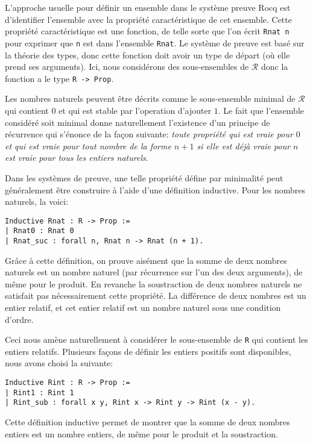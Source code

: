 \documentclass[draft]{jflart}
\begin{document}
L'approche usuelle pour définir un ensemble dans le système preuve
Rocq est d'identifier l'ensemble avec la propriété caractéristique de
cet ensemble.  Cette propriété caractéristique est une fonction, de
telle sorte que l'on écrit \texttt{Rnat n} pour exprimer que \texttt{n} est
dans l'ensemble \texttt{Rnat}.  Le système de preuve est basé sur la
théorie des types, donc cette fonction doit avoir un type de départ
(où elle prend ses arguments).  Ici, nous considérons des
sous-ensembles de \(\mathcal R\) donc la fonction a le type \texttt{R ->
  Prop}.

Les nombres naturels peuvent être décrits comme le sous-ensemble
minimal de \(\mathcal R\) qui contient \(0\) et qui est stable par
l'operation d'ajouter \(1\).  Le fait que l'ensemble considéré soit
minimal donne naturellement l'existence d'un principe de récurrence
qui s'énonce de la façon suivante: {\em toute propriété qui est vraie
  pour \(0\) et qui est vraie pour tout nombre de la forme \(n + 1\)
  si elle est déjà vraie pour \(n\) est vraie pour tous les entiers
  naturels}.

Dans les systèmes de preuve, une telle propriété défine par minimalité
peut généralement être construire à l'aide d'une définition inductive.
Pour les nombres naturels, la voici:
\begin{verbatim}
Inductive Rnat : R -> Prop :=
| Rnat0 : Rnat 0
| Rnat_suc : forall n, Rnat n -> Rnat (n + 1).
\end{verbatim}

Grâce à cette définition, on prouve aisément que la somme de deux
nombres naturels est un nombre naturel (par récurrence sur l'un des
deux arguments), de même pour le produit.  En revanche la soustraction
de deux nombres naturels ne satisfait pas nécessairement cette
propriété.  La différence de deux nombres est un entier relatif, et
cet entier relatif est un nombre naturel sous une condition d'ordre.

Ceci nous amène naturellement à considérer le sous-ensemble de \texttt{R}
qui contient les entiers relatifs.  Plusieurs façons de définir les
entiers positifs sont disponibles, nous avons choisi la suivante:
\begin{verbatim}
Inductive Rint : R -> Prop :=
| Rint1 : Rint 1
| Rint_sub : forall x y, Rint x -> Rint y -> Rint (x - y).
\end{verbatim}
Cette définition inductive permet de montrer que la somme de deux
nombres entiers est un nombre entiers, de même pour le produit et
la soustraction.
\end{document}
